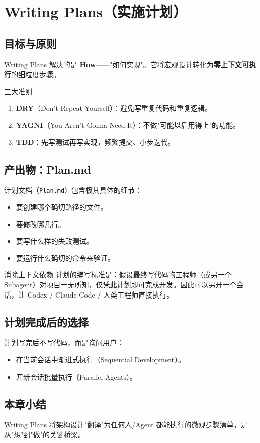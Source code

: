 \section{Writing Plans（实施计划）}

\subsection{目标与原则}

Writing Plans 解决的是 \textbf{How}——"如何实现"。它将宏观设计转化为\textbf{零上下文可执行}的细粒度步骤。

\begin{importantbox}{三大准则}
\begin{enumerate}
    \item \textbf{DRY}（Don't Repeat Yourself）：避免写重复代码和重复逻辑。
    \item \textbf{YAGNI}（You Aren't Gonna Need It）：不做"可能以后用得上"的功能。
    \item \textbf{TDD}：先写测试再写实现，频繁提交、小步迭代。
\end{enumerate}
\end{importantbox}

\subsection{产出物：Plan.md}

计划文档（\texttt{Plan.md}）包含极其具体的细节：
\begin{itemize}
    \item 要创建哪个确切路径的文件。
    \item 要修改哪几行。
    \item 要写什么样的失败测试。
    \item 要运行什么确切的命令来验证。
\end{itemize}

\begin{knowledgebox}{消除上下文依赖}
计划的编写标准是：假设最终写代码的工程师（或另一个 Subagent）对项目一无所知，仅凭此计划即可完成开发。因此可以另开一个会话，让 Codex / Claude Code / 人类工程师直接执行。
\end{knowledgebox}

\subsection{计划完成后的选择}

计划写完后不写代码，而是询问用户：
\begin{itemize}
    \item 在当前会话中渐进式执行（Sequential Development）。
    \item 开新会话批量执行（Parallel Agents）。
\end{itemize}

\subsection{本章小结}

Writing Plans 将架构设计"翻译"为任何人/Agent 都能执行的微观步骤清单，是从"想"到"做"的关键桥梁。


